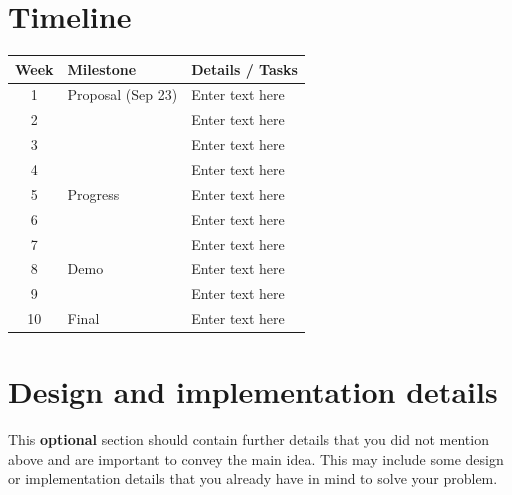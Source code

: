 \documentclass[a4paper]{article}
\begin{document}
\section*{Timeline}
\begin{tabular}{|c|l|l|}
\hline
\textbf{Week} & \textbf{Milestone}        & \textbf{Details / Tasks} \\
\hline
1   & Proposal (Sep 23)      &  Enter text here\\
2   &                        &  Enter text here\\
3   &                        &  Enter text here\\
4   &                        &  Enter text here\\
5   & Progress               &  Enter text here\\
6   &                        &  Enter text here\\
7   &                        &  Enter text here\\
8   & Demo                   &  Enter text here\\
9   &                        &  Enter text here\\
10  & Final                  &  Enter text here\\
\hline
\end{tabular}

\section*{Design and implementation details}

This {\bf optional} section should contain further details that you did not mention above and are important to convey the main idea. This may include some design or implementation details that you already have in mind to solve your problem.
\end{document}
